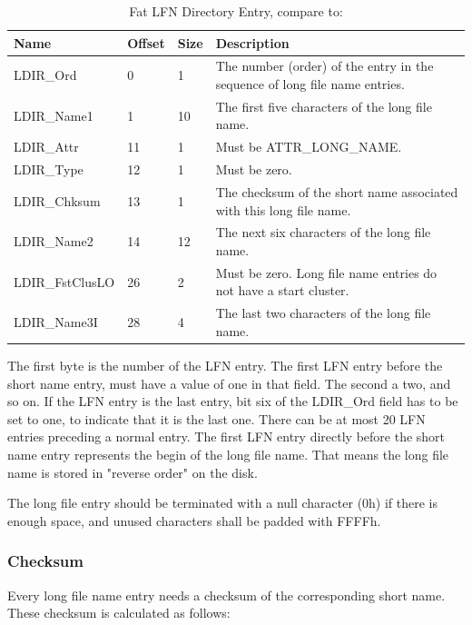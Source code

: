 \begin{table}[!ht]
\caption{Fat LFN Directory Entry, compare to: \cite{usb_ms_jan, fatgen103}}
\centering
\begin{tabular}{|l|l|l|p{8.5cm}|}
\hline\hline
\textbf{Name} & \textbf{Offset} & \textbf{Size} & \textbf{Description}\\ \hline
LDIR\_Ord & 0 & 1 & The number (order) of the entry in the sequence of long file name entries. \\ \hline
LDIR\_Name1 & 1 & 10 & The first five characters of the long file name. \\ \hline
LDIR\_Attr & 11 & 1 & Must be ATTR\_LONG\_NAME. \\ \hline
LDIR\_Type & 12 & 1 & Must be zero. \\ \hline
LDIR\_Chksum & 13 & 1 & The checksum of the short name associated with this long file name. \\ \hline
LDIR\_Name2& 14 & 12 & The next six characters of the long file name. \\ \hline
LDIR\_FstClusLO & 26 & 2 & Must be zero. Long file name entries do not have a start cluster. \\ \hline
LDIR\_Name3I & 28 & 4 & The last two characters of the long file name. \\ \hline
\end{tabular}
\label{table:fat_lfn_dir_entry}
\end{table}

The first byte is the number of the LFN entry. The first LFN entry before the short name entry, must have a value of one in that field. The second a two, and so on. If the LFN entry is the last entry, bit six of the LDIR\_Ord field has to be set to one, to indicate that it is the last one. There can be at most 20 LFN entries preceding a normal entry. The first LFN entry directly before the short name entry represents the begin of the long file name. That means the long file name is stored in "reverse order" on the disk. 

The long file entry should be terminated with a null character (0h) if there is enough space, and unused characters shall be padded with FFFFh.

\subsubsection{Checksum}

Every long file name entry needs a checksum of the corresponding short name. These checksum is calculated as follows:

